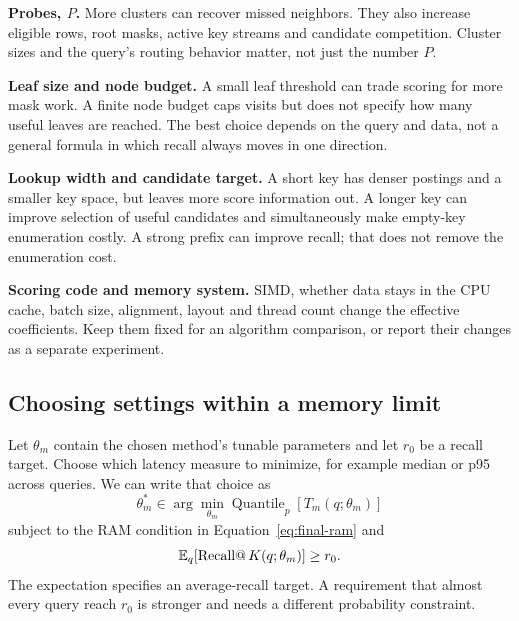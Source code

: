\textbf{Probes, $P$.} More clusters can recover missed neighbors. They also increase eligible
rows, root masks, active key streams and candidate competition. Cluster sizes and the query's
routing behavior matter, not just the number $P$.

\textbf{Leaf size and node budget.} A small leaf threshold can trade scoring for more mask work.
A finite node budget caps visits but does not specify how many useful leaves are reached.
The best choice depends on the query and data, not a general formula in which recall always moves in one direction.

\textbf{Lookup width and candidate target.} A short key has denser postings and a smaller key
space, but leaves more score information out. A longer key can improve selection of useful candidates
and simultaneously make empty-key enumeration costly. A strong prefix can improve recall;
that does not remove the enumeration cost.

\textbf{Scoring code and memory system.} SIMD, whether data stays in the CPU cache, batch size, alignment, layout and
thread count change the effective coefficients. Keep them fixed for an algorithm comparison,
or report their changes as a separate experiment.

\subsection{Choosing settings within a memory limit}
Let $\theta_m$ contain the chosen method's tunable parameters and let $r_0$ be a recall target.
Choose which latency measure to minimize, for example median or p95 across queries. We can write that choice as
\begin{equation}
\theta_m^*\in\arg\min_{\theta_m}\operatorname{Quantile}_{p}[T_m(q;\theta_m)]
\end{equation}
subject to the RAM condition in Equation~\eqref{eq:final-ram} and
\begin{equation}
\mathbb E_q[\operatorname{Recall@}K(q;\theta_m)]\geq r_0.
\label{eq:optimization}
\end{equation}
The expectation specifies an average-recall target. A requirement that almost every query
reach $r_0$ is stronger and needs a different probability constraint.

